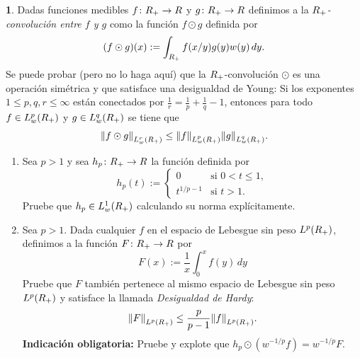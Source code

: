 \documentclass[10pt,a4paper]{report}
\newcommand{\norm}[2][y]{{\if#1y\left\fi\lVert#2\if#1y\right\fi\rVert}}
\newcommand{\dd}{\,d}
\newcommand{\Real}{R}
\theoremstyle{definition}
\newtheorem{problem}{\color{azul}{Problema}}
\renewcommand{\theproblem}{\Alph{problem}}
\numberwithin{equation}{problem}
\providecommand{\norm}[1]{\left\lVert#1\right\rVert}
\begin{document}
\begin{problem}
		Dadas funciones medibles $f \colon \RP \to \Real$ y $g \colon \RP \to \Real$ definimos a la \emph{$\RP$-convolución entre $f$ y $g$} como la función $f \odot g$ definida por
		\begin{equation}\label{RP-convolution}
			(f \odot g)(x) := \int_{\RP} f(x/y) g(y) w(y) \dd y.
		\end{equation}
		Se puede probar (pero no lo haga aquí) que la $\RP$-convolución $\odot$ es una operación simétrica y que satisface una desigualdad de Young:
		Si los exponentes $1 \leq p, q, r \leq \infty$ están conectados por $\frac{1}{r} = \frac{1}{p} + \frac{1}{q} - 1$, entonces para todo $f \in L^p_w(\RP)$ y $g \in L^q_w(\RP)$ se tiene que
		\begin{equation}\label{RP-Young}
			\norm{f \odot g}_{L^r_w(\RP)} \leq \norm{f}_{L^p_w(\RP)} \norm{g}_{L^q_w(\RP)}.
		\end{equation}
		\begin{enumerate}[label=\textbf{\theproblem.\Roman{*}.},ref=\theproblem.\Roman{*},parsep=1ex]
			\item\label{q:Hardy-precursor} Sea $p > 1$ y sea $h_p \colon \RP \to \Real$ la función definida por
			\begin{equation*}
				h_p(t) := \begin{cases}
					0 & \text{si } 0 < t \leq 1,\\
					t^{1/p-1} & \text{si } t > 1.
				\end{cases}
			\end{equation*}
			Pruebe que $h_p \in L^1_w(\RP)$ calculando su norma explícitamente.
			\item\label{q:Hardy} Sea $p > 1$.
			Dada cualquier $f$ en el espacio de Lebesgue sin peso $L^p(\RP)$, definimos a la función $F \colon \RP \to \Real$ por
			\begin{equation*}
				F(x) := \frac{1}{x} \int_0^x f(y) \dd y
			\end{equation*}
			Pruebe que $F$ también pertenece al mismo espacio de Lebesgue sin peso $L^p(\RP)$ y satisface la llamada \emph{Desigualdad de Hardy}:
			\begin{equation*}
				\norm{F}_{L^p(\RP)} \leq \frac{p}{p-1} \norm{f}_{L^p(\RP)}.
			\end{equation*}
			\textbf{Indicación obligatoria:}
			Pruebe y explote que $h_p \odot (w^{-1/p} f) = w^{-1/p} F$.
		\end{enumerate}
	\end{problem}
\end{document}
